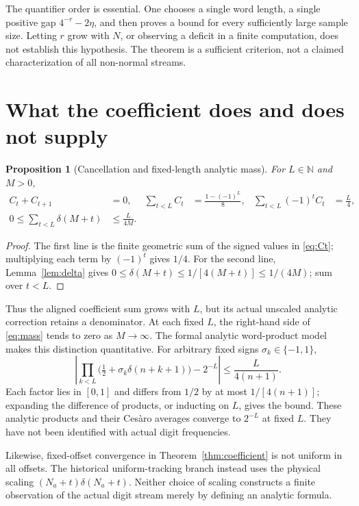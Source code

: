 \documentclass[11pt,a4paper]{article}
\newtheorem{proposition}[theorem]{Proposition}
\theoremstyle{definition}
\theoremstyle{remark}
\newcommand{\N}{\mathbb N}
\begin{document}
The quantifier order is essential. One chooses a single word length,
a single positive gap $4^{-r}-2\eta$, and then proves a bound for
every sufficiently large sample size. Letting $r$ grow with $N$,
or observing a deficit in a finite computation, does not establish
this hypothesis. The theorem is a sufficient criterion, not a claimed
characterization of all non-normal streams.

\section{What the coefficient does and does not supply}
\label{sec:limits}

\begin{proposition}[Cancellation and fixed-length analytic mass]
\label{prop:mass}
For $L\in\N$ and $M>0$,
\begin{align}
 C_t+C_{t+1}&=0,&
 \sum_{t<L}C_t&=\frac{1-(-1)^L}{8},&
 \sum_{t<L}(-1)^tC_t&=\frac L4, \label{eq:cancel}\\
 0\le\sum_{t<L}\delta(M+t)&\le\frac{L}{4M}.
 \label{eq:mass}
\end{align}
\end{proposition}
\begin{proof}
The first line is the finite geometric sum of the signed values
in \eqref{eq:Ct}; multiplying each term by $(-1)^t$ gives $1/4$.
For the second line, Lemma~\ref{lem:delta} gives
$0\le\delta(M+t)\le1/[4(M+t)]\le1/(4M)$; sum over $t<L$.
\end{proof}

Thus the aligned coefficient sum grows with $L$, but its actual
unscaled analytic correction retains a denominator. At each fixed
$L$, the right-hand side of \eqref{eq:mass} tends to zero as
$M\to\infty$.
The formal analytic word-product model makes this distinction
quantitative. For arbitrary fixed signs $\sigma_k\in\{-1,1\}$,
\begin{equation}
 \left|\prod_{k<L}\bigl(\tfrac12+\sigma_k\delta(n+k+1)\bigr)
          -2^{-L}\right|\le\frac{L}{4(n+1)}.
 \label{eq:product}
\end{equation}
Each factor lies in $[0,1]$ and differs from $1/2$ by at most
$1/[4(n+1)]$; expanding the difference of products, or inducting
on $L$, gives the bound. These analytic products and their
Ces\`aro averages converge to $2^{-L}$ at fixed $L$.
They have not been identified with actual digit frequencies.

Likewise, fixed-offset convergence in Theorem~\ref{thm:coefficient}
is not uniform in all offsets. The historical uniform-tracking
branch instead uses the physical scaling
$(N_a+t)\delta(N_a+t)$.
Neither choice of scaling constructs a finite observation of the
actual digit stream merely by defining an analytic formula.
\end{document}
